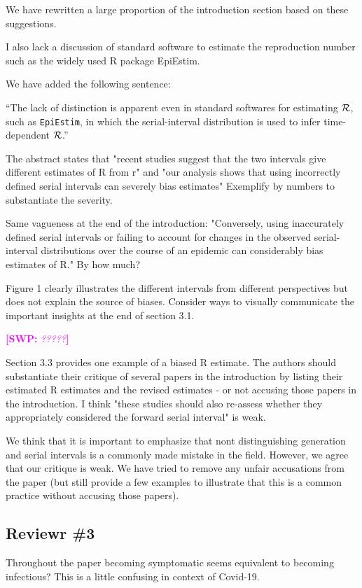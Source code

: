 \documentclass[12pt]{article}
\newcommand{\RR}{\ensuremath{{\cal R}}}
\newcommand{\rev}{\subsection*}
\newcommand{\revtext}{\textsf}
\newcommand{\comment}[3]{\textcolor{#1}{\textbf{[#2: }\textsl{#3}\textbf{]}}}
\newcommand{\swp}[1]{\comment{magenta}{SWP}{#1}}
\begin{document}
We have rewritten a large proportion of the introduction section based on these suggestions.

\revtext{I also lack a discussion of standard software to estimate the reproduction number such as the widely used R package EpiEstim.}

We have added the following sentence:

``The lack of distinction is apparent even in standard softwares for estimating \RR, such as \texttt{EpiEstim}, in which the serial-interval distribution is used to infer time-dependent \RR \citep{thompson2019improved}.''

\revtext{The abstract states that "recent studies suggest that the two intervals give different estimates of R from r" and "our analysis shows that using incorrectly defined serial intervals can severely bias estimates" Exemplify by numbers to substantiate the severity.}



\revtext{Same vagueness at the end of the introduction: "Conversely, using inaccurately defined serial intervals or failing to account for changes in the observed serial-interval distributions over the course of an epidemic can considerably bias estimates of R." By how much?}



\revtext{Figure 1 clearly illustrates the different intervals from different perspectives but does not explain the source of biases. Consider ways to visually communicate the important insights at the end of section 3.1.}

\swp{?????}

\revtext{Section 3.3 provides one example of a biased R estimate. The authors should substantiate their critique of several papers in the introduction by listing their estimated R estimates and the revised estimates - or not accusing those papers in the introduction. I think "these studies should also re-assess whether they appropriately considered the forward serial interval" is weak.}

We think that it is important to emphasize that nont distinguishing generation and serial intervals is a commonly made mistake in the field. 
However, we agree that our critique is weak.
We have tried to remove any unfair accusations from the paper (but still provide a few examples to illustrate that this is a common practice without accusing those papers).

\rev{Reviewr \#3}

\revtext{Throughout the paper becoming symptomatic seems equivalent to becoming infectious? This is a little confusing in context of Covid-19.}
\end{document}
